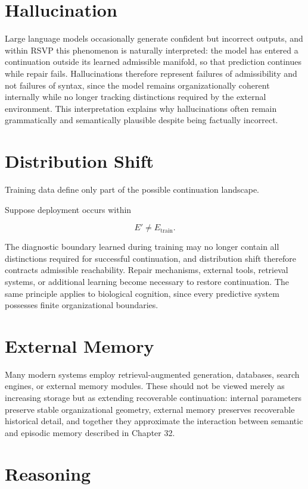 \documentclass[11pt,oneside]{book}
\numberwithin{equation}{chapter}
\theoremstyle{definition}
\theoremstyle{plain}
\begin{document}
\section{Hallucination}

Large language models occasionally generate confident but incorrect outputs, and within RSVP this phenomenon is naturally interpreted: the model has entered a continuation outside its learned admissible manifold, so that prediction continues while repair fails. Hallucinations therefore represent failures of admissibility and not failures of syntax, since the model remains organizationally coherent internally while no longer tracking distinctions required by the external environment. This interpretation explains why hallucinations often remain grammatically and semantically plausible despite being factually incorrect.

\section{Distribution Shift}

Training data define only part of the possible continuation landscape.

Suppose deployment occurs within

\[
E'
\neq
E_{\mathrm{train}}.
\]

The diagnostic boundary learned during training may no longer contain all distinctions required for successful continuation, and distribution shift therefore contracts admissible reachability. Repair mechanisms, external tools, retrieval systems, or additional learning become necessary to restore continuation. The same principle applies to biological cognition, since every predictive system possesses finite organizational boundaries.

\section{External Memory}

Many modern systems employ retrieval-augmented generation, databases, search engines, or external memory modules. These should not be viewed merely as increasing storage but as extending recoverable continuation: internal parameters preserve stable organizational geometry, external memory preserves recoverable historical detail, and together they approximate the interaction between semantic and episodic memory described in Chapter 32.

\section{Reasoning}
\end{document}
